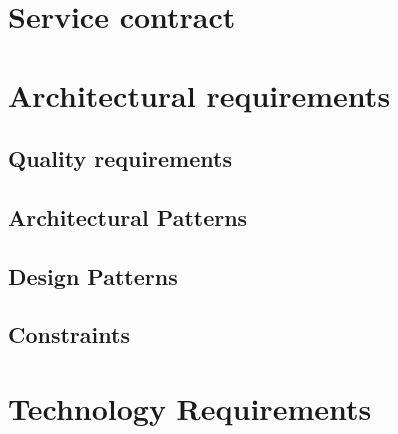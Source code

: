 \documentclass{article}
\begin{document}
	
	\newpage
	
	\section*{Service contract}	
	
	\newpage
	
	\section*{Architectural requirements}
	
	\subsection*{Quality requirements}	
	\subsection*{Architectural Patterns}	
	\subsection*{Design Patterns}	
	\subsection*{Constraints}	
	
	\newpage
	\section*{Technology Requirements}
	
	
\end{document}
